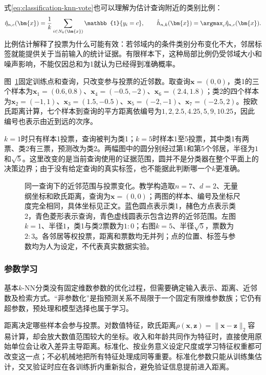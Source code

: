 式\eqref{eq:classification-knn-vote}也可以理解为估计查询附近的类别比例：
\begin{equation}
  \hat\eta_{n,c}(\bm{x})
  =\frac{1}{k}\sum_{i\in N_k(\bm{x})}\mathbb{1}\{y_i=c\},
  \qquad
  \hat h_{n,k}(\bm{x})=\argmax_c\hat\eta_{n,c}(\bm{x}).
  \label{eq:classification-knn-posterior}
\end{equation}
比例估计解释了投票为什么可能有效：若邻域内的条件类别分布变化不大，邻居标签就能提供关于当前输入的统计证据。有限样本下，这种局部比例仍受邻域大小和噪声影响，不能仅因总和为1就认为已经得到准确概率。

图~\ref{fig:classification-knn-neighborhood}固定训练点和查询，只改变参与投票的近邻数。取查询$\bm{x}=(0,0)$，类1的三个样本为$\bm{x}_1=(0.6,0.8)$、$\bm{x}_4=(-0.5,-2)$、$\bm{x}_6=(2.4,1.8)$；类2的四个样本为$\bm{x}_2=(-1,1)$、$\bm{x}_3=(1.5,-0.5)$、$\bm{x}_5=(-2,-1)$、$\bm{x}_7=(-2.5,2)$。按欧氏距离计算，七个样本到查询的平方距离依编号为$1,2,2.5,4.25,5,9,10.25$，因此编号也表示由近到远的次序。

$k=1$时只有样本1投票，查询被判为类1；$k=5$时样本1至5投票，其中类1有两票、类2有三票，预测改为类2。两幅图中的圆分别经过第1和第5个邻居，半径为$1$和$\sqrt5$。这里改变的是当前查询使用的证据范围，圆并不是分类器在整个平面上的决策边界；由于没有给定查询的真实标签，也不能据此判断哪一个$k$更准确。

\begin{figure}[htbp]
  \centering
  
  \caption{同一查询下的近邻范围与投票变化。教学构造取$n=7$、$d=2$、无量纲坐标和欧氏距离，查询为$\bm{x}=(0,0)$；两图的样本、编号及坐标尺度完全相同，具体坐标见正文。蓝色圆点表示类1，赭色方点表示类2，青色菱形表示查询，青色虚线圆表示包含边界的近邻范围。左图$k=1$、半径$1$，类1与类2票数为$1:0$；右图$k=5$、半径$\sqrt5$，票数为$2:3$。各邻居等权投票，距离和票数均无并列；点的位置、标签与参数均为人为设定，不代表真实数据实验。}
  \label{fig:classification-knn-neighborhood}
\end{figure}

\subsubsection{参数学习}
\label{sec:classification-knn-learning}

基本$k$-NN分类没有固定维数参数的优化过程，但需要确定输入表示、距离、近邻数及检索方式。“非参数化”是指预测关系不局限于一个固定有限维参数族；它仍有超参数，预处理和模型选择也属于学习。

距离决定哪些样本会参与投票。对数值特征，欧氏距离$\rho(\bm{x},\bm{z})=\lVert\bm{x}-\bm{z}\rVert_2$容易计算，却会放大数值范围较大的坐标。收入和年龄共同作为特征时，直接使用原始单位会让收入差异主导距离。标准化、按业务意义设定尺度或学习特征权重都可改变这一点；不必机械地把所有特征处理成同等重要。标准化参数只能从训练集估计，交叉验证时应在各训练折内重新拟合，避免验证信息提前进入距离。

